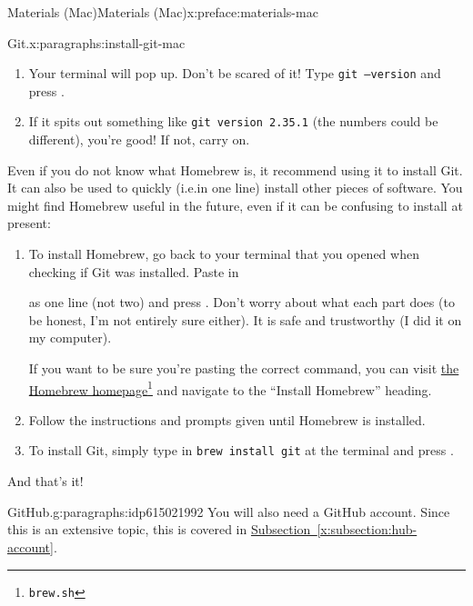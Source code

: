\documentclass[oneside,10pt,]{book}
\newcommand{\xreffont}{\relax}
\newcommand{\mono}[1]{\texttt{#1}}
\newcommand{\kbd}[1]{\keys{{#1}}}
\begin{document}
\begin{preface}{Materials (Mac)}{}{Materials (Mac)}{}{}{x:preface:materials-mac}
\begin{paragraphs}{Git.}{x:paragraphs:install-git-mac}
\begin{enumerate}
\item{}Your terminal will pop up. Don't be scared of it! Type \mono{git --version} and press \kbd{Enter}.%
\item{}If it spits out something like \mono{git version 2.35.1} (the numbers could be different), you're good! If not, carry on.%
\end{enumerate}
%
\par
Even if you do not know what Homebrew is, it recommend using it to install Git. It can also be used to quickly (i.e.\@ in one line) install other pieces of software. You might find Homebrew useful in the future, even if it can be confusing to install at present:%
\begin{enumerate}
\item{}To install Homebrew, go back to your terminal that you opened when checking if Git was installed. Paste in%
as one line (not two) and press \kbd{Enter}. Don't worry about what each part does (to be honest, I'm not entirely sure either). It is safe and trustworthy (I did it on my computer).%
\par
If you want to be sure you're pasting the correct command, you can visit \href{https://brew.sh/}{the Homebrew homepage}\footnote{\nolinkurl{brew.sh}\label{g:fn:idp615024552}} and navigate to the ``Install Homebrew'' heading.%
\item{}Follow the instructions and prompts given until Homebrew is installed.%
\item{}To install Git, simply type in \mono{brew install git} at the terminal and press \kbd{Enter}.%
\end{enumerate}
And that's it!%
\end{paragraphs}%
\begin{paragraphs}{GitHub.}{g:paragraphs:idp615021992}%
You will also need a GitHub account. Since this is an extensive topic, this is covered in \hyperref[x:subsection:hub-account]{Subsection~{\xreffont\ref{x:subsection:hub-account}}}.%
\end{paragraphs}%
\end{preface}
%
%
\typeout{************************************************}
\typeout{************************************************}
%
\end{document}
